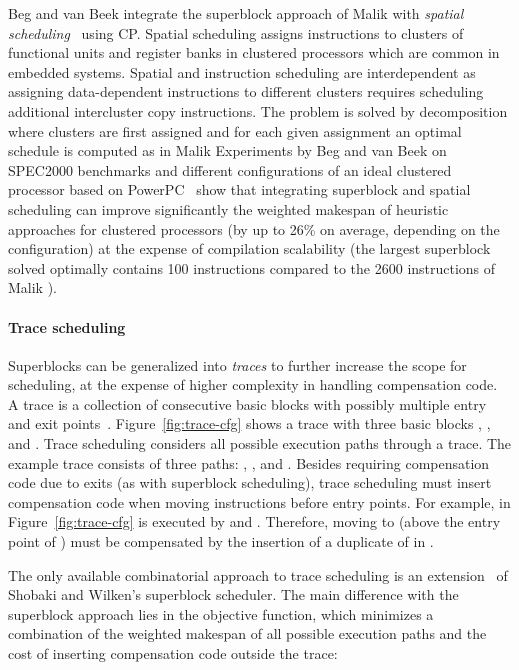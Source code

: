 \documentclass[acmsmall,authorversion,nonacm]{acmart}
\begin{document}
Beg and van Beek integrate the superblock approach of Malik \etal{}
with \emph{spatial scheduling}~\cite{Beg2013} using CP.
Spatial scheduling assigns instructions to clusters of functional
units and register banks in clustered processors which are common in
embedded systems.
Spatial and instruction scheduling are interdependent as assigning
data-dependent instructions to different clusters requires scheduling
additional intercluster copy instructions.
The problem is solved by decomposition where clusters are first
assigned and for each given assignment an optimal schedule is computed
as in Malik \etal{}
Experiments by Beg and van Beek on SPEC2000 benchmarks and different
configurations of an ideal clustered processor based on
PowerPC~\cite{Diefendorff1994} show that integrating superblock and
spatial scheduling can improve significantly the weighted makespan of
heuristic approaches for clustered processors (by up to 26\% on
average, depending on the configuration) at the expense of compilation
scalability (the largest superblock solved optimally contains 100
instructions compared to the 2600 instructions of Malik \etal{}).

\paragraph{Trace scheduling}

Superblocks can be generalized into \emph{traces} to further increase
the scope for scheduling, at the expense of higher complexity in
handling compensation code.
A trace is a collection of consecutive basic blocks with possibly
multiple entry and exit points~\cite{Fisher1981}.
Figure~\ref{fig:trace-cfg} shows a trace with three basic blocks
, , and .
Trace scheduling considers all possible execution paths through a
trace.
The example trace consists of three paths: ,
, and .
Besides requiring compensation code due to exits (as with superblock
scheduling), trace scheduling must insert compensation code when
moving instructions before entry points.
For example,  in Figure~\ref{fig:trace-cfg} is executed by 
and .
Therefore, moving  to  (above the entry point of ) must
be compensated by the insertion of a duplicate of  in .

The only available combinatorial approach to trace scheduling is an
extension~\cite{Shobaki2009} of Shobaki and Wilken's superblock
scheduler.
The main difference with the superblock approach lies in the objective
function, which minimizes a combination of the weighted makespan of
all possible execution paths and the cost of inserting compensation
code outside the trace:
\end{document}
